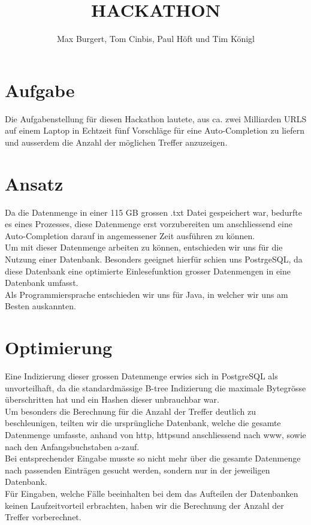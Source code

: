 \documentclass[11pt]{article} %
\title{\textbf{HACKATHON}}
\author{Max Burgert, Tom Cinbis, Paul Höft und Tim Königl}
\begin{document}
\maketitle

\section{Aufgabe}
Die Aufgabenstellung für diesen Hackathon lautete, aus ca. zwei Milliarden URLS auf einem Laptop in Echtzeit fünf Vorschläge für eine Auto-Completion zu liefern und ausserdem die Anzahl der möglichen Treffer anzuzeigen. 

\section{Ansatz}
Da die Datenmenge in einer 115 GB grossen .txt Datei gespeichert war, bedurfte es eines Prozesses, diese Datenmenge erst vorzubereiten um anschliessend eine Auto-Completion darauf in angemessener Zeit ausführen zu können.\\
Um mit dieser Datenmenge arbeiten zu können, entschieden wir uns für die Nutzung einer Datenbank. Besonders geeignet hierfür schien uns PostrgeSQL, da diese Datenbank eine optimierte Einlesefunktion grosser Datenmengen in eine Datenbank umfasst.\\
Als Programmiersprache entschieden wir uns für Java, in welcher wir uns am Besten auskannten.

\section{Optimierung}
Eine Indizierung dieser grossen Datenmenge erwies sich in PostgreSQL als unvorteilhaft, da die standardmässige B-tree Indizierung die maximale Bytegrösse überschritten hat und ein Hashen dieser unbrauchbar war.\\
Um besonders die Berechnung für die Anzahl der Treffer deutlich zu beschleunigen, teilten wir die ursprüngliche Datenbank, welche die gesamte Datenmenge umfasste, anhand von \glqq http\grqq, \glqq https\grqq und anschliessend nach \glqq www\grqq, sowie nach den Anfangsbuchstaben \glqq a-z\grqq  auf.\\
Bei entsprechender Eingabe musste so nicht mehr über die gesamte Datenmenge nach passenden Einträgen gesucht werden, sondern nur in der jeweiligen Datenbank.\\
Für Eingaben, welche Fälle beeinhalten bei dem das Aufteilen der Datenbanken keinen Laufzeitvorteil erbrachten, haben wir die Berechnung der Anzahl der Treffer vorberechnet.
\end{document}
